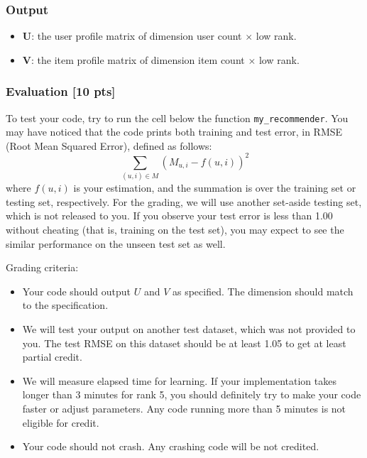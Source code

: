 \documentclass[twoside,10pt]{article}
\begin{document}
\subsubsection*{Output}
\begin{itemize}
  \item \textbf{U}: the user profile matrix of dimension user count
  $\times$ low rank.
  \item \textbf{V}: the item profile matrix of dimension item count
  $\times$ low rank.
\end{itemize}

\subsubsection*{Evaluation [10 pts]}
To test your code, try to run the cell below the function \texttt{my\_recommender}. You may have
noticed that the code prints both training and test error, in RMSE
(Root Mean Squared Error), defined as follows:
\begin{equation}
\sum_{(u,i) \in M} (M_{u,i} - f(u,i))^2 \nonumber
\end{equation}
where $f(u,i)$ is your estimation, and the summation is over the
training set or testing set, respectively. For the grading, we will
use another set-aside testing set, which is not released to you. If
you observe your test error is less than 1.00 without cheating (that
is, training on the test set), you may expect to see the
similar performance on the unseen test set as well.


Grading criteria:
\begin{itemize}
  \item Your code should output $U$ and $V$ as specified. The dimension should match to the specification.
  \item We will test your output on another test dataset, which was not provided to you. The test RMSE on this dataset should be at least 1.05 to get at least partial credit.
  \item We will measure elapsed time for learning. If your implementation takes longer than 3 minutes for rank 5, you should definitely try to make your code faster or adjust parameters. Any code running more than 5 minutes is not eligible for credit.
  \item Your code should not crash. Any crashing code will be not credited.
\end{itemize}
\end{document}

